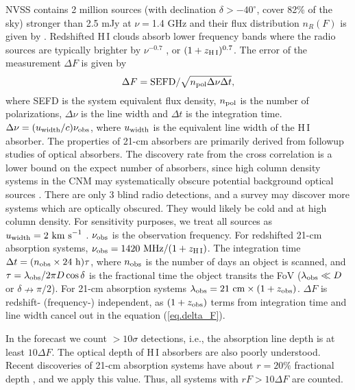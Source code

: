 \documentclass[]{raa}
\newcommand{\HI}{{H{\small\,I}}}
\begin{document}
NVSS contains 2 million sources (with declination $\delta >-40^\circ$,
cover 82\% of the sky) stronger than 2.5
mJy at $\nu=$1.4 GHz \citep{1998AJ....115.1693C} and their flux
distribution $n_R(F)$ is given by \cite{1984ApJ...287..461C}.
Redshifted {\HI} clouds absorb lower frequency bands where
the radio sources are typically brighter by $\nu^{-0.7}$
\citep{1998AJ....115.1693C}, or $(1+z_{\rm \HI})^{0.7}$.
The error of the measurement $\Delta F$ is given by
\begin{equation}\label{eq.delta_F}
    \Delta F={\rm SEFD}/\sqrt{n_{\rm pol}\Delta\nu\Delta t},
\end{equation}
where SEFD is the system equivalent flux density, $n_{\rm pol}$
is the number of polarizations, $\Delta\nu$ is the line width and
$\Delta t$ is the integration time. $\Delta\nu=(u_{\rm width}/c)\nu_{\rm obs}$,
where $u_{\rm width}$ is the equivalent line width of the {\HI}
absorber. The properties of 21-cm absorbers are primarily derived from
followup studies of optical absorbers. The discovery rate from the
cross correlation is a lower bound on the expect number of absorbers,
since high column density systems in the CNM may systematically
obscure potential background optical sources \citep{2014PhRvL.113d1303Y}. There are
only 3 blind radio detections, and a survey may discover more systems
which are optically obscured. They would likely be cold and at high
column density. For sensitivity purposes, we treat all sources as
$u_{\rm width}=2\ {\rm km\ s}^{-1}$
\citep{1982ApJ...259..495W,2005ARA&A..43..861W}.
$\nu_{\rm obs}$ is the observation frequency. For redshifted
21-cm absorption systems, $\nu_{\rm obs}=1420\ {\rm MHz}/(1+z_{\rm \HI})$.
The integration time $\Delta t=(n_{\rm obs}\times 24\ {\rm h})\tau$,
where $n_{\rm obs}$ is the number of days an object is scanned,
and $\tau=\lambda_{\rm obs}/2\pi D\cos\delta$ is the fractional time the object
transits the FoV ($\lambda_{\rm obs}\ll D$ or $\delta\nrightarrow\pi/2$).
For 21-cm absorption systems $\lambda_{\rm obs}=21\ {\rm cm}\times (1+z_{\rm obs})$.
$\Delta F$ is redshift- (frequency-) independent, as $(1+z_{\rm obs})$ terms
from integration time and line width cancel out
in the equation (\ref{eq.delta_F}).

In the forecast we count $>10\sigma$ detections, i.e., the absorption
line depth is at least $10\Delta F$. The optical depth of {\HI} absorbers
are also poorly understood. Recent discoveries of 21-cm absorption systems
have about $r=20\%$ fractional depth \citep{2015MNRAS.453.1249A,2015MNRAS.453.1268Z},
and we apply this value. Thus, all systems with $rF>10\Delta F$ are counted.
\end{document}
